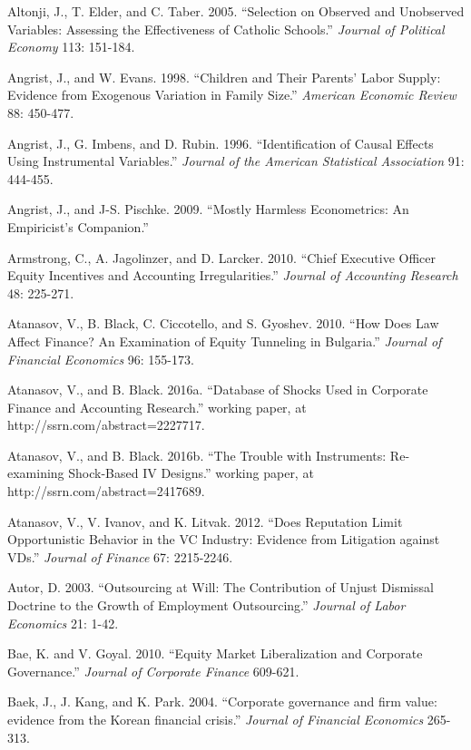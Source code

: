 \noindent Altonji, J., T. Elder, and C. Taber. 2005. ``Selection on Observed and Unobserved Variables:  Assessing the Effectiveness of Catholic Schools.''  \textit{Journal of Political Economy} 113: 151-184.

\noindent Angrist, J., and W. Evans. 1998. ``Children and Their Parents' Labor Supply:  Evidence from Exogenous Variation in Family Size.'' \textit{American Economic Review} 88: 450-477.

\noindent Angrist, J., G. Imbens, and D. Rubin. 1996. ``Identification of Causal Effects Using Instrumental Variables.''  \textit{Journal of the American Statistical Association} 91: 444-455.

\noindent Angrist, J., and J-S. Pischke. 2009. ``Mostly Harmless Econometrics:  An Empiricist's Companion.''

\noindent Armstrong, C., A. Jagolinzer, and D. Larcker. 2010. ``Chief Executive Officer Equity Incentives and Accounting Irregularities.''  \textit{Journal of Accounting Research} 48: 225-271.

\noindent Atanasov, V., B. Black, C. Ciccotello, and S. Gyoshev. 2010. ``How Does Law Affect Finance?  An Examination of Equity Tunneling in Bulgaria.''  \textit{Journal of Financial Economics }96: 155-173.

\noindent Atanasov, V., and B. Black. 2016a. ``Database of Shocks Used in Corporate Finance and Accounting Research.'' working paper, at http://ssrn.com/abstract=2227717.

\noindent Atanasov, V., and B. Black. 2016b. ``The Trouble with Instruments:  Re-examining Shock-Based IV Designs.''\textit{ }working paper, at http://ssrn.com/abstract=2417689.

\noindent Atanasov, V., V. Ivanov, and K. Litvak. 2012. ``Does Reputation Limit Opportunistic Behavior in the VC Industry:  Evidence from Litigation against VDs.''  \textit{Journal of Finance} 67: 2215-2246. 

\noindent Autor, D. 2003. ``Outsourcing at Will:  The Contribution of Unjust Dismissal Doctrine to the Growth of Employment Outsourcing.''  \textit{Journal of Labor Economics} 21: 1-42.

\noindent Bae, K. and V. Goyal. 2010. ``Equity Market Liberalization and Corporate Governance.'' \textit{Journal of Corporate Finance} 609-621.

\noindent Baek, J., J. Kang, and K. Park. 2004. ``Corporate governance and firm value: evidence from the Korean financial crisis.''  \textit{Journal of Financial Economics} 265-313.

